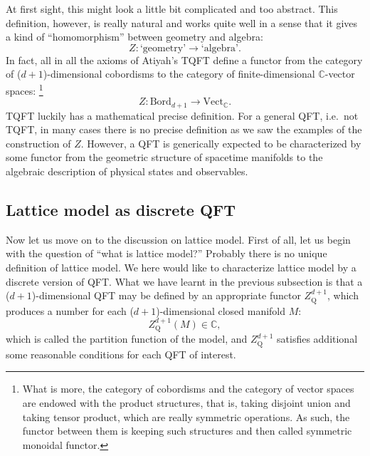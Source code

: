 At first sight, this might look a little bit complicated and too abstract.
This definition, however, is really natural and works quite well in
a sense that it gives a kind of ``homomorphism'' between geometry
and algebra: 
\[
Z:\text{`geometry'}\longrightarrow\text{`algebra'}.
\]
 In fact, all in all the axioms of Atiyah's TQFT define a functor
from the category of ($d+1$)-dimensional cobordisms to the category
of finite-dimensional $\mathbb{C}$-vector spaces:%
%
\footnote{What is more, the category of cobordisms and the category of vector
spaces are endowed with the product structures, that is, taking disjoint
union and taking tensor product, which are really symmetric operations.
As such, the functor between them is keeping such structures and then
called symmetric monoidal functor. }
% 
\begin{equation}
  Z:\mathrm{Bord}_{d+1}  \longrightarrow  \mathrm{Vect}_{\mathbb{C}}.
\end{equation}
 TQFT luckily has a mathematical precise definition. For a general
QFT, i.e.~not TQFT, in many cases there is no precise definition as
we saw the examples of the construction of $Z$. However, a QFT is
generically expected to be characterized by some functor from the
geometric structure of spacetime manifolds to the algebraic description
of physical states and observables. 





\subsection{Lattice model as discrete QFT}

Now let us move on to the discussion on lattice model. First of all,
let us begin with the question of ``what is lattice model?'' Probably
there is no unique definition of lattice model. We here would like
to characterize lattice model by a discrete version of QFT. What we
have learnt in the previous subsection is that a ($d+1$)-dimensional
QFT may be defined by an appropriate functor $Z_{\mathrm{Q}}^{d+1}$,
which produces a number for each ($d+1$)-dimensional closed manifold
$M$: 
\begin{equation}
  Z_{\mathrm{Q}}^{d+1}\left(M\right)  \in  \mathbb{C},
\end{equation}
 which is called the partition function of the model, and $Z_{\mathrm{Q}}^{d+1}$
satisfies additional some reasonable conditions for each QFT of interest. 

